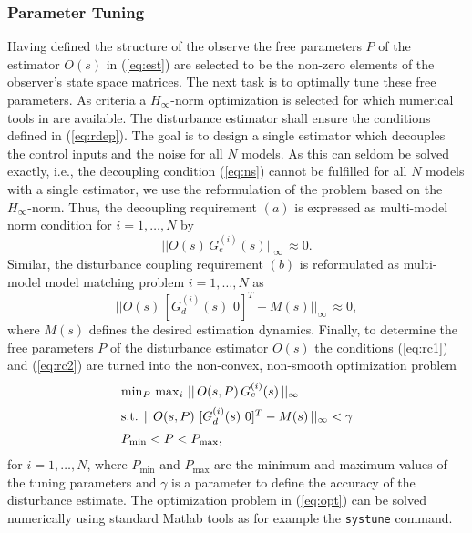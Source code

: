 \documentclass[graybox]{svmult}
\begin{document}
\subsubsection{Parameter Tuning}\label{sec:tuning}\vspace{-1mm}
Having defined the structure of the observe  the free parameters $P$ of the estimator $O(s)$ in (\ref{eq:est}) are selected to be the non-zero elements of the observer's state space matrices. The next task is to optimally tune these free parameters. As criteria a $H_\infty$-norm optimization is selected for which numerical tools in \matlab are available. The disturbance estimator shall ensure the conditions defined in (\ref{eq:rdep}). The goal is to design a single estimator which decouples the control inputs and the noise for all $N$ models. As this can seldom be solved exactly, i.e., the decoupling condition (\ref{eq:ns}) cannot be fulfilled for all $N$ models with a single estimator, we use the reformulation of the problem based on the $H_\infty$-norm. Thus, the decoupling requirement $(a)$ is expressed as  multi-model norm condition for  $i=1,\dots,N$ by
\begin{equation}\label{eq:rc1}
||O(s) \, G_e^{(i)}(s) ||_\infty  \,\approx 0.
\end{equation}
Similar, the disturbance coupling requirement $(b)$ is reformulated as multi-model model matching problem  $i=1,\dots,N$ as
\begin{equation}\label{eq:rc2}
|| O(s) \, [ G_d^{(i)}(s) \,\, 0 ]^T - M(s) ||_\infty \,\approx 0,
\end{equation}
where $M(s)$ defines the desired estimation dynamics. Finally, to determine the free parameters $P$ of the disturbance estimator $O(s)$ the conditions (\ref{eq:rc1}) and (\ref{eq:rc2}) are turned into the non-convex, non-smooth optimization problem
\begin{equation} \label{eq:opt}
\begin{array}{l}
\min_{P} \, \max_{i} \, || \, O(s,P) \, G_e^{(i)}(s) \, ||_\infty \vspace{+2mm} \\
\textnormal{s.t. } ||\, O(s,P) \,\, [ G_d^{(i)}(s) \,\, 0 ]^T - M(s) \, ||_\infty < \gamma \vspace{+2mm} \\
P_{\min} < P < P_{\max},
\end{array}
\end{equation}
for $i=1,\dots,N$, where $P_{\min}$ and $P_{\max}$ are the minimum and maximum values of the tuning parameters and $\gamma$ is a parameter to define the accuracy of the disturbance estimate. The optimization problem in (\ref{eq:opt}) can be  solved numerically using standard Matlab tools as for example the \texttt{systune} command.
\end{document}
